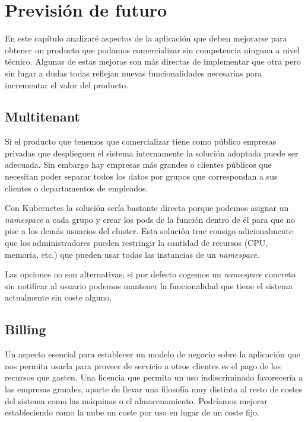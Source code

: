 \chapter{Previsión de futuro}
\label{chap:prevision-futuro}

En este capítulo analizaré aspectos de la aplicación que deben mejorarse para obtener un producto que podamos comercializar sin competencia ninguna a nivel técnico. Algunas de estas mejoras son más directas de implementar que otra pero sin lugar a dudas todas reflejan nuevas funcionalidades necesarias para incrementar el valor del producto.

\section{Multitenant}

Si el producto que tenemos que comercializar tiene como público empresas privadas que desplieguen el sistema internamente la solución adoptada puede ser adecuada. Sin embargo hay empresas más grandes o clientes públicos que necesitan poder separar todos los datos por grupos que correspondan a sus clientes o departamentos de empleados.

Con Kubernetes la solución sería bastante directa porque podemos asignar un \emph{namespace} a cada grupo y crear los pods de la función dentro de él para que no pise a los demás usuarios del cluster. Esta solución trae consigo adicionalmente que los administradores pueden restringir la cantidad de recursos (CPU, memoria, etc.) que pueden usar todas las instancias de un \emph{namespace}.

Las opciones no son alternativas; si por defecto cogemos un \emph{namespace} concreto sin notificar al usuario podemos mantener la funcionalidad que tiene el sistema actualmente sin coste alguno.

\section{Billing}

Un aspecto esencial para establecer un modelo de negocio sobre la aplicación que nos permita usarla para proveer de servicio a otros clientes es el pago de los recursos que gasten. Una licencia que permita un uso indiscriminado favorecería a las empresas grandes, aparte de llevar una filosofía muy distinta al resto de costes del sistema como las máquinas o el almacenamiento. Podríamos mejorar estableciendo como la nube un coste por uso en lugar de un coste fijo.


